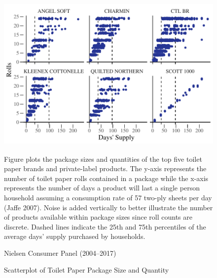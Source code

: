 \documentclass[AER]{AEA_mal}
\begin{document}
\begin{figure}[!htb]
\centering
\caption{Scatterplot of Toilet Paper Package Size and Quantity}
\includegraphics[width = 4.8in, height = 3in]{../5_figures/tpSizeQuantityDistributionAllProdsColor.pdf}
\begin{figurenotes}
Figure plots the package sizes and quantities of the top five toilet paper brands and private-label products. The y-axis represents the number of toilet paper rolls contained in a package while the x-axis represents the number of days a product will last a single person household assuming a consumption rate of 57 two-ply sheets per day (Jaffe 2007). Noise is added vertically to better illustrate the number of products available within package sizes since roll counts are discrete. Dashed lines indicate the 25th and 75th percentiles of the average days' supply purchased by households.
\end{figurenotes}
\begin{figurenotes}[Source]
Nielsen Consumer Panel (2004--2017)
\end{figurenotes}
\label{fig:tpSizeQuantityDistributionAllProds}
\end{figure}
\end{document}
